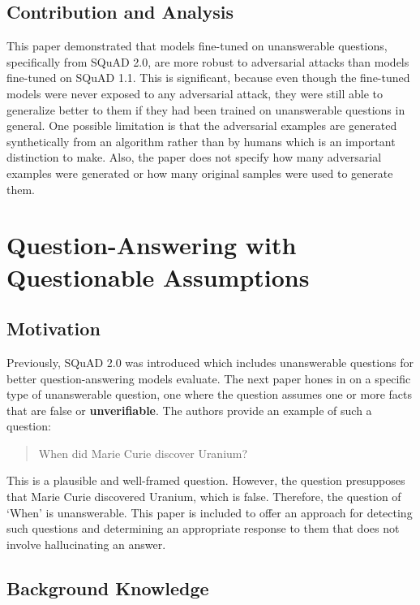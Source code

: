 \documentclass[letterpaper, 11pt]{article}
\begin{document}
\subsection{Contribution and Analysis}
This paper demonstrated that models fine-tuned on unanswerable questions, specifically from SQuAD 2.0, are more robust to adversarial attacks than models fine-tuned on SQuAD 1.1. This is significant, because even though the fine-tuned models were never exposed to any adversarial attack, they were still able to generalize better to them if they
had been trained on unanswerable questions in general. One possible limitation is that the adversarial examples are generated synthetically from an algorithm rather than by humans which is an important distinction to make. Also, the paper does not specify how many adversarial examples were generated or how many original samples were used to generate them. 

\section{Question-Answering with Questionable Assumptions}
\label{subsec:question-answering-with-questionable-assumptions}

\subsection{Motivation}
Previously, SQuAD 2.0 was introduced which includes unanswerable questions for better question-answering models evaluate. 
The next paper \citep{questionanswering} hones in on a specific type of unanswerable question, one where the question assumes
one or more facts that are false or \textbf{unverifiable}. The authors provide an example of such a question:
\begin{quotation}
    \noindent
    When did Marie Curie discover Uranium?
\end{quotation}
This is a plausible and well-framed question. However, the question presupposes that Marie Curie discovered Uranium, which is false. Therefore, the question of `When' is unanswerable.
This paper is included to offer an approach for detecting such questions and determining an appropriate response to them that does not involve hallucinating an answer.
\subsection{Background Knowledge}
\end{document}
